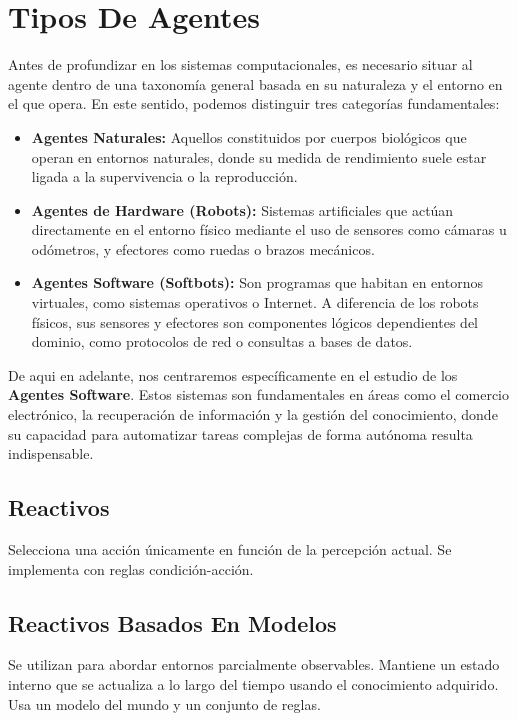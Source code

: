 \section{Tipos De Agentes}
Antes de profundizar en los sistemas computacionales, es necesario situar al agente dentro de una taxonomía general basada en su naturaleza y el entorno en el que opera. En este sentido, podemos distinguir tres categorías fundamentales:
\begin{itemize}
    \item \textbf{Agentes Naturales:} Aquellos constituidos por cuerpos biológicos que operan en entornos naturales, donde su medida de rendimiento suele estar ligada a la supervivencia o la reproducción.
    
    \item \textbf{Agentes de Hardware (Robots):} Sistemas artificiales que actúan directamente en el entorno físico mediante el uso de sensores como cámaras u odómetros, y efectores como ruedas o brazos mecánicos.
    
    \item \textbf{Agentes Software (Softbots):} Son programas que habitan en entornos virtuales, como sistemas operativos o Internet. A diferencia de los robots físicos, sus sensores y efectores son componentes lógicos dependientes del dominio, como protocolos de red o consultas a bases de datos.
\end{itemize}

\bigskip

De aqui en adelante, nos centraremos específicamente en el estudio de los \textbf{Agentes Software}. Estos sistemas son fundamentales en áreas como el comercio electrónico, la recuperación de información y la gestión del conocimiento, donde su capacidad para automatizar tareas complejas de forma autónoma resulta indispensable.

\subsection{Reactivos} Selecciona una acción únicamente en función de la percepción actual. Se implementa con reglas condición-acción.

\subsection{Reactivos Basados En Modelos} Se utilizan para abordar entornos parcialmente observables. Mantiene un estado interno que se actualiza
a lo largo del tiempo usando el conocimiento adquirido. Usa un modelo del mundo y un conjunto de reglas.

